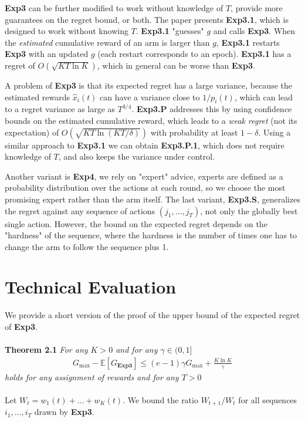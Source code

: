 \documentclass[12pt,a4paper]{article}
\begin{document}
\textbf{Exp3} can be further modified to  work without knowledge of $T$, provide more guarantees on the regret bound, or both.  The paper presents \textbf{Exp3.1}, which is designed to work without knowing $T$. \textbf{Exp3.1} "guesses" $g$ and calls \textbf{Exp3}.  When the \textit{estimated} cumulative reward of an arm is larger than $g$, \textbf{Exp3.1} restarts \textbf{Exp3} with an updated $g$ (each restart corresponds to an epoch). \textbf{Exp3.1} has a regret of ${O}(\sqrt{KT\ln K})$, which in general can be worse than \textbf{Exp3}.

A problem of \textbf{Exp3} is that its expected regret has a large variance, because the estimated rewards $\hat{x}_i(t)$  can have a variance close to ${1}/{p_i(t)}$, which can lead to a regret variance as large as $T^{3/4}$. 
\textbf{Exp3.P} addresses this by using confidence bounds on the estimated cumulative reward, which leads  to a  \textit{weak regret} (not its expectation)  of ${O}(\sqrt{KT\ln(KT/\delta)})$ with probability at least $1-\delta$. Using a similar approach to \textbf{Exp3.1} we can obtain \textbf{Exp3.P.1}, which does not require knowledge of $T$, and also keeps the variance under control. 

Another variant is \textbf{Exp4}, we rely on "expert" advice, experts are defined as a probability distribution over the actions at each round, so we choose the most promising expert rather than the arm itself.  The last variant, \textbf{Exp3.S}, generalizes the regret against any sequence of actions $(j_1,\dots,j_T)$, not only the globally best single action.  However, the bound on the expected regret depends on the "hardness" of the sequence, where the hardness is the number of times one has to change the arm to follow the sequence plus 1.

\section{Technical Evaluation}

We provide a short version of the proof of the upper bound of the expected regret of \textbf{Exp3}. 
\\\\
\textbf{Theorem 2.1}	\textit{For any $K > 0$ and for any $\gamma \in (0,1]$} 
	\begin{align*}
		G_{\max}-\mathbb{E}[G_{\textbf{Exp3}}] \leq (e-1)\gamma G_{\max}+\frac{K\ln K}{\gamma}
	\end{align*}
	\textit{holds for any assignment of rewards and for any $T > 0$}
\\\\
Let $W_t = w_1(t)+ \dots +  w_K(t)$. We bound the ratio $W_{t+1}/W_t$ for all sequences $i_1,\dots,i_T$ drawn by \textbf{Exp3}.
\end{document}
